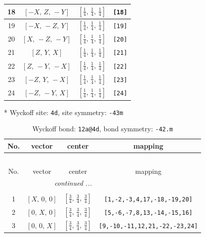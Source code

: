 \documentclass[fleqn,8pt]{jsarticle}
\begin{document}
\begin{longtable}{cccc}
18 & $\left[ - X,\, Z,\, - Y \right]$ & $\left[ \frac{1}{4},\, \frac{1}{4},\, \frac{1}{4} \right]$ & {\tt [18]} \\ \hline
19 & $\left[ - X,\, - Z,\, Y \right]$ & $\left[ \frac{1}{4},\, \frac{1}{4},\, \frac{1}{4} \right]$ & {\tt [19]} \\ \hline
20 & $\left[ X,\, - Z,\, - Y \right]$ & $\left[ \frac{1}{4},\, \frac{1}{4},\, \frac{1}{4} \right]$ & {\tt [20]} \\ \hline
21 & $\left[ Z,\, Y,\, X \right]$ & $\left[ \frac{1}{4},\, \frac{1}{4},\, \frac{1}{4} \right]$ & {\tt [21]} \\ \hline
22 & $\left[ Z,\, - Y,\, - X \right]$ & $\left[ \frac{1}{4},\, \frac{1}{4},\, \frac{1}{4} \right]$ & {\tt [22]} \\ \hline
23 & $\left[ - Z,\, Y,\, - X \right]$ & $\left[ \frac{1}{4},\, \frac{1}{4},\, \frac{1}{4} \right]$ & {\tt [23]} \\ \hline
24 & $\left[ - Z,\, - Y,\, X \right]$ & $\left[ \frac{1}{4},\, \frac{1}{4},\, \frac{1}{4} \right]$ & {\tt [24]} \\
\end{longtable}
* Wyckoff site: {\tt 4d}, site symmetry: {\tt -43m}
\renewcommand{\arraystretch}{1.2}
\begin{longtable}{cccc}
\caption{Wyckoff bond: {\tt 12a@4d}, bond symmetry: {\tt -42.m}}
 \\
 \hline \hline
No. & vector & center & mapping \\ \hline \endfirsthead

\multicolumn{3}{l}{\tablename\ \thetable{}} \\
 \hline \hline
No. & vector & center & mapping \\ \hline \endhead

 \hline \hline
\multicolumn{3}{r}{\footnotesize\it continued ...} \\ \endfoot

 \hline \hline
\multicolumn{3}{r}{} \\ \endlastfoot

1 & $\left[ X,\, 0,\, 0 \right]$ & $\left[ \frac{3}{4},\, \frac{3}{4},\, \frac{3}{4} \right]$ & {\tt [1,-2,-3,4,17,-18,-19,20]} \\ \hline
2 & $\left[ 0,\, X,\, 0 \right]$ & $\left[ \frac{3}{4},\, \frac{3}{4},\, \frac{3}{4} \right]$ & {\tt [5,-6,-7,8,13,-14,-15,16]} \\ \hline
3 & $\left[ 0,\, 0,\, X \right]$ & $\left[ \frac{3}{4},\, \frac{3}{4},\, \frac{3}{4} \right]$ & {\tt [9,-10,-11,12,21,-22,-23,24]} \\
\end{longtable}
\end{document}

